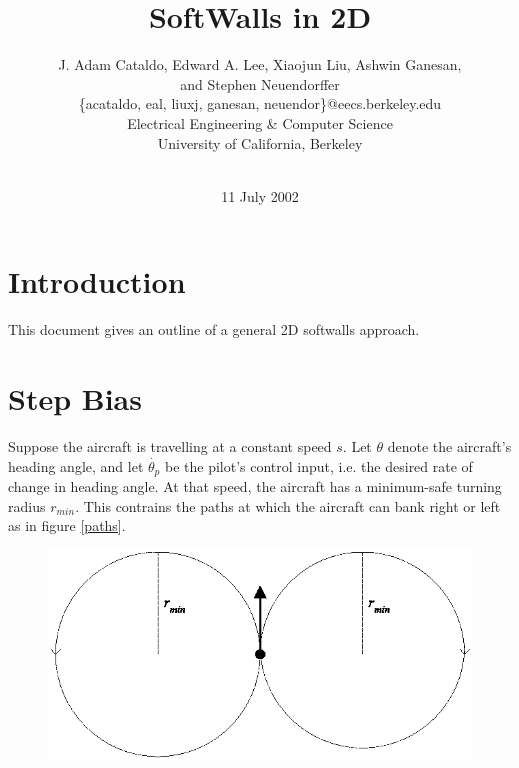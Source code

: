 \documentclass[11pt]{article}
\begin{document}


\title{SoftWalls in 2D}

\author{J. Adam Cataldo, Edward A. Lee, Xiaojun Liu, Ashwin Ganesan,\\
and Stephen Neuendorffer\\ 
\{acataldo, eal, liuxj, ganesan, neuendor\}@eecs.berkeley.edu\\
Electrical Engineering \& Computer Science\\ 
University of California, Berkeley\\ 
\\}

\date{11 July 2002}
\maketitle


\section{Introduction}

This document gives an outline of a general 2D softwalls approach.



\section{Step Bias}


Suppose the aircraft is travelling at a constant speed $s$.  Let
$\theta$ denote the aircraft's heading angle, and let
$\dot{\theta_{p}}$ be the pilot's control input, i.e. the desired rate
of change in heading angle.  At that speed, the aircraft has a
minimum-safe turning radius $r_{min}$.  This contrains the paths at
which the aircraft can bank right or left as in figure \ref{paths}.

\begin{figure}[btp]
\centering
\includegraphics[width=5in]{aircraftpaths.eps}
\end{figure}
\end{document}
